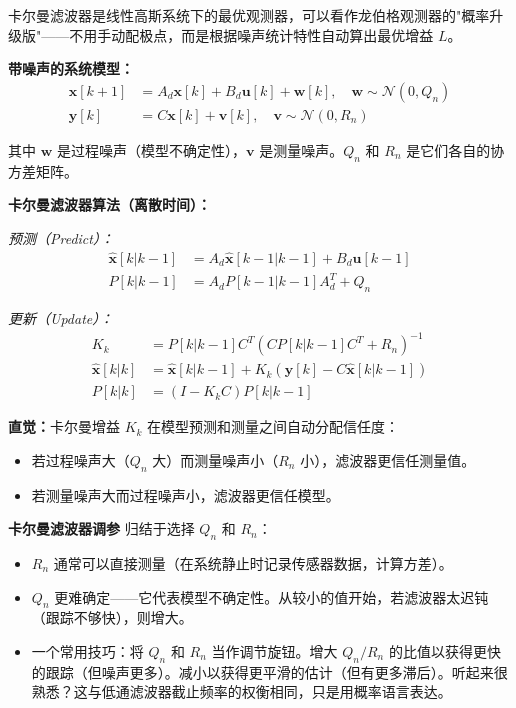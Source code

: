 卡尔曼滤波器是线性高斯系统下的最优观测器，可以看作龙伯格观测器的"概率升级版"——不用手动配极点，而是根据噪声统计特性自动算出最优增益 $L$。

\textbf{带噪声的系统模型：}
\begin{align}
\mathbf{x}[k+1] &= A_d \mathbf{x}[k] + B_d \mathbf{u}[k] + \mathbf{w}[k], \quad \mathbf{w} \sim \mathcal{N}(0, Q_n) \\
\mathbf{y}[k] &= C \mathbf{x}[k] + \mathbf{v}[k], \quad \mathbf{v} \sim \mathcal{N}(0, R_n)
\end{align}

其中 $\mathbf{w}$ 是过程噪声（模型不确定性），$\mathbf{v}$ 是测量噪声。$Q_n$ 和 $R_n$ 是它们各自的协方差矩阵。

\textbf{卡尔曼滤波器算法（离散时间）：}

\textit{预测（Predict）：}
\begin{align}
\hat{\mathbf{x}}[k|k-1] &= A_d \hat{\mathbf{x}}[k-1|k-1] + B_d \mathbf{u}[k-1] \\
P[k|k-1] &= A_d P[k-1|k-1] A_d^T + Q_n
\end{align}

\textit{更新（Update）：}
\begin{align}
K_k &= P[k|k-1] C^T (C P[k|k-1] C^T + R_n)^{-1} \\
\hat{\mathbf{x}}[k|k] &= \hat{\mathbf{x}}[k|k-1] + K_k (\mathbf{y}[k] - C \hat{\mathbf{x}}[k|k-1]) \\
P[k|k] &= (I - K_k C) P[k|k-1]
\end{align}

\textbf{直觉：}卡尔曼增益 $K_k$ 在模型预测和测量之间自动分配信任度：
\begin{itemize}
    \item 若过程噪声大（$Q_n$ 大）而测量噪声小（$R_n$ 小），滤波器更信任测量值。
    \item 若测量噪声大而过程噪声小，滤波器更信任模型。
\end{itemize}

\textbf{卡尔曼滤波器调参} 归结于选择 $Q_n$ 和 $R_n$：
\begin{itemize}
    \item $R_n$ 通常可以直接测量（在系统静止时记录传感器数据，计算方差）。
    \item $Q_n$ 更难确定——它代表模型不确定性。从较小的值开始，若滤波器太迟钝（跟踪不够快），则增大。
    \item 一个常用技巧：将 $Q_n$ 和 $R_n$ 当作调节旋钮。增大 $Q_n / R_n$ 的比值以获得更快的跟踪（但噪声更多）。减小以获得更平滑的估计（但有更多滞后）。听起来很熟悉？这与低通滤波器截止频率的权衡相同，只是用概率语言表达。
\end{itemize}

